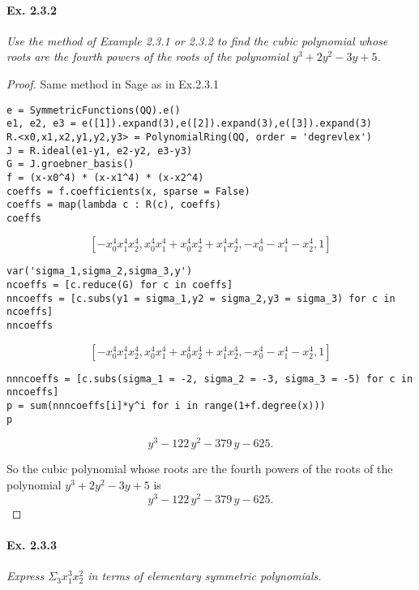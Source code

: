 \documentclass[11pt,a4paper]{article}
\begin{document}
\paragraph{Ex. 2.3.2}

{\it Use the method of Example 2.3.1 or 2.3.2 to find the cubic polynomial whose roots are the fourth powers of the roots of the polynomial $y^3+2y^2-3y+5$.
}

\begin{proof}
Same method in Sage as in Ex.2.3.1
\begin{verbatim}
e = SymmetricFunctions(QQ).e()
e1, e2, e3 = e([1]).expand(3),e([2]).expand(3),e([3]).expand(3)
R.<x0,x1,x2,y1,y2,y3> = PolynomialRing(QQ, order = 'degrevlex')
J = R.ideal(e1-y1, e2-y2, e3-y3)
G = J.groebner_basis()
f = (x-x0^4) * (x-x1^4) * (x-x2^4)
coeffs = f.coefficients(x, sparse = False)
coeffs = map(lambda c : R(c), coeffs)
coeffs
\end{verbatim}
$$\left[- x_{0}^{4} x_{1}^{4} x_{2}^{4}, x_{0}^{4} x_{1}^{4} + x_{0}^{4}
x_{2}^{4} + x_{1}^{4} x_{2}^{4}, - x_{0}^{4} -  x_{1}^{4} -  x_{2}^{4},
1\right]
$$
\begin{verbatim}
var('sigma_1,sigma_2,sigma_3,y')
ncoeffs = [c.reduce(G) for c in coeffs]
nncoeffs = [c.subs(y1 = sigma_1,y2 = sigma_2,y3 = sigma_3) for c in ncoeffs]
nncoeffs
\end{verbatim}
$$\left[- x_{0}^{4} x_{1}^{4} x_{2}^{4}, x_{0}^{4} x_{1}^{4} + x_{0}^{4}
x_{2}^{4} + x_{1}^{4} x_{2}^{4}, - x_{0}^{4} -  x_{1}^{4} -  x_{2}^{4},
1\right]
$$
\begin{verbatim}
nnncoeffs = [c.subs(sigma_1 = -2, sigma_2 = -3, sigma_3 = -5) for c in nncoeffs]
p = sum(nnncoeffs[i]*y^i for i in range(1+f.degree(x)))
p
\end{verbatim}
$$y^{3} - 122 \, y^{2} - 379 \, y - 625.$$

So the cubic polynomial whose roots are the fourth powers of the roots of the polynomial $y^3+2y^2-3y+5$ is
$$y^{3} - 122 \, y^{2} - 379 \, y - 625.$$
\end{proof}

\paragraph{Ex. 2.3.3}

{\it Express $\Sigma_3 x_1^3 x_2^2$ in terms of elementary symmetric polynomials.
}
\end{document}
